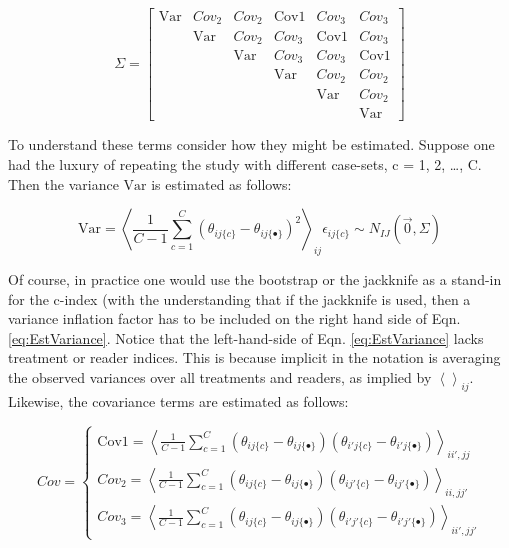 \documentclass[
]{book}
\begin{document}
\[
\Sigma=
\begin{bmatrix}
\text{Var} & Cov_2 & Cov_2 & \text{Cov1} & Cov_3 & Cov_3 \\
& \text{Var} & Cov_2 & Cov_3 & \text{Cov1} & Cov_3 \\ 
&  & \text{Var} & Cov_3 & Cov_3 & \text{Cov1} \\ 
&  &  & \text{Var} & Cov_2 & Cov_2 \\
&  &  &  & \text{Var} & Cov_2 \\ 
&  &  &  &  & \text{Var}
\end{bmatrix}
\]

To understand these terms consider how they might be estimated. Suppose one had the luxury of repeating the study with different case-sets, c = 1, 2, \ldots, C. Then the variance \(\text{Var}\) is estimated as follows:

\begin{equation}
\text{Var}=
\left \langle \frac{1}{C-1}\sum_{c=1}^{C} (\theta_{ij\{c\}}-\theta_{ij\{\bullet\}})^2 \right \rangle_{ij}
\epsilon_{ij\{c\}} \sim N_{IJ}(\vec{0},\Sigma)
\label{eq:EstVariance}
\end{equation}

Of course, in practice one would use the bootstrap or the jackknife as a stand-in for the c-index (with the understanding that if the jackknife is used, then a variance inflation factor has to be included on the right hand side of Eqn. \eqref{eq:EstVariance}. Notice that the left-hand-side of Eqn. \eqref{eq:EstVariance} lacks treatment or reader indices. This is because implicit in the notation is averaging the observed variances over all treatments and readers, as implied by \(\left \langle \right \rangle _{ij}\). Likewise, the covariance terms are estimated as follows:

\begin{equation}
Cov=\left\{\begin{matrix}
\text{Cov1}=\left \langle \frac{1}{C-1}\sum_{c=1}^{C} (\theta_{ij\{c\}}-\theta_{ij\{\bullet\}}) (\theta_{i'j\{c\}}-\theta_{i'j\{\bullet\}}) \right \rangle_{ii',jj}\\ 
Cov_2=\left \langle \frac{1}{C-1}\sum_{c=1}^{C} (\theta_{ij\{c\}}-\theta_{ij\{\bullet\}}) (\theta_{ij'\{c\}}-\theta_{ij'\{\bullet\}}) \right \rangle_{ii,jj'}\\ 
Cov_3=\left \langle \frac{1}{C-1}\sum_{c=1}^{C} (\theta_{ij\{c\}}-\theta_{ij\{\bullet\}}) (\theta_{i'j'\{c\}}-\theta_{i'j'\{\bullet\}}) \right \rangle_{ii',jj'}
\end{matrix}\right.
\label{eq:EstCovMatrix}
\end{equation}
\end{document}
